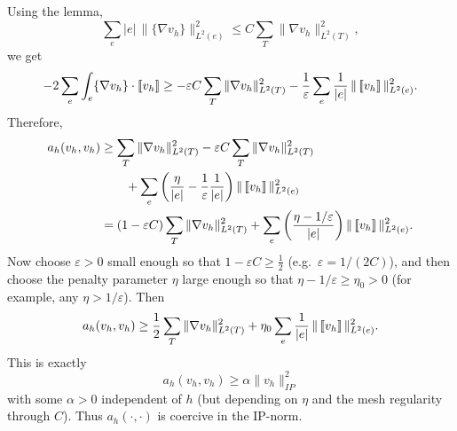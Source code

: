 Using the lemma,
\[
    \sum_e |e|\,\|\{\nabla v_h\}\|_{L^2(e)}^2
    \le C \sum_T \|\nabla v_h\|_{L^2(T)}^2,
\]
we get
\[
    - 2\sum_e \int_e \{\nabla v_h\}\cdot\left[\!\left[ v_h \right]\!\right]
    \ge -\varepsilon C \sum_T \|\nabla v_h\|_{L^2(T)}^2
    - \frac{1}{\varepsilon}\sum_e \frac{1}{|e|}\,\|\left[\!\left[ v_h \right]\!\right]\|_{L^2(e)}^2.
\]
Therefore,
\[
    \begin{aligned}
        a_h(v_h,v_h)
         & \ge \sum_T \|\nabla v_h\|_{L^2(T)}^2
        -\varepsilon C \sum_T \|\nabla v_h\|_{L^2(T)}^2                                                                \\
         & \qquad + \sum_e \left(\frac{\eta}{|e|} - \frac{1}{\varepsilon}\frac{1}{|e|}\right)\|\left[\!\left[ v_h \right]\!\right]\|_{L^2(e)}^2 \\
         & = (1 - \varepsilon C)\sum_T \|\nabla v_h\|_{L^2(T)}^2
        + \sum_e \left(\frac{\eta - 1/\varepsilon}{|e|}\right)\|\left[\!\left[ v_h \right]\!\right]\|_{L^2(e)}^2.
    \end{aligned}
\]
Now choose $\varepsilon>0$ small enough so that $1 - \varepsilon C \ge \tfrac{1}{2}$
(e.g.\ $\varepsilon = 1/(2C)$), and then choose the penalty parameter $\eta$ large enough
so that $\eta - 1/\varepsilon \ge \eta_0 > 0$ (for example, any $\eta > 1/\varepsilon$).
Then
\[
    a_h(v_h,v_h)
    \ge \frac{1}{2}\sum_T \|\nabla v_h\|_{L^2(T)}^2
    + \eta_0\sum_e \frac{1}{|e|}\,\|\left[\!\left[ v_h \right]\!\right]\|_{L^2(e)}^2.
\]
This is exactly
\[
    a_h(v_h,v_h) \ge \alpha \|v_h\|_{IP}^2
\]
with some $\alpha>0$ independent of $h$ (but depending on $\eta$ and the mesh
regularity through $C$).
Thus $a_h(\cdot,\cdot)$ is coercive in the IP-norm.
